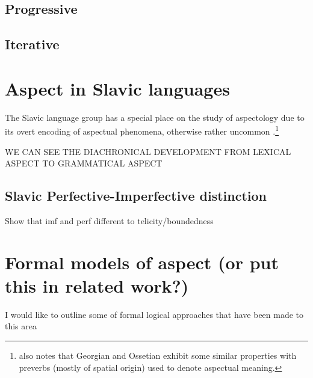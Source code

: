\subsection*{Progressive}
\subsection*{Iterative}

\section{Aspect in Slavic languages}
The Slavic language group has a special place on the study of aspectology due to its overt encoding of aspectual phenomena, otherwise rather uncommon \citep{slavstyleaspect}.\footnote{\citet{slavstyleaspect} also notes that Georgian and Ossetian exhibit some similar properties with preverbs (mostly of spatial origin) used to denote aspectual meaning.}

WE CAN SEE THE DIACHRONICAL DEVELOPMENT FROM LEXICAL ASPECT TO GRAMMATICAL ASPECT

\subsection{Slavic Perfective-Imperfective distinction}
Show that imf and perf different to telicity/boundedness

\section{Formal models of aspect (or put this in related work?)}
I would like to outline some of formal logical approaches that have been made to this area